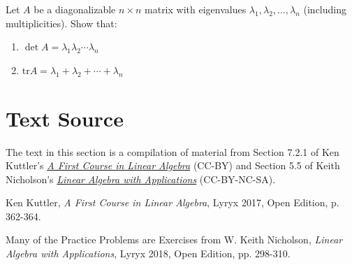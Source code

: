 \documentclass{ximera}
\begin{document}
\begin{problem}\label{prb:det_and_tr_diagonalizable}
Let $A$ be a diagonalizable $n \times n$ matrix with eigenvalues $\lambda_{1}, \lambda_{2}, \dots, \lambda_{n}$ (including multiplicities). Show that:

\begin{enumerate}
\item $\det A = \lambda_{1}\lambda_{2}\cdots \lambda_{n}$
\item $\mbox{tr} A = \lambda_{1} + \lambda_{2} + \cdots + \lambda_{n}$
\end{enumerate}
\end{problem}



\section*{Text Source}
The text in this section is a compilation of material from Section 7.2.1 of Ken Kuttler's \href{https://open.umn.edu/opentextbooks/textbooks/a-first-course-in-linear-algebra-2017}{\it A First Course in Linear Algebra} (CC-BY) and Section 5.5 of Keith Nicholson's \href{https://open.umn.edu/opentextbooks/textbooks/linear-algebra-with-applications}{\it Linear Algebra with Applications} (CC-BY-NC-SA).

Ken Kuttler, {\it  A First Course in Linear Algebra}, Lyryx 2017, Open Edition, p. 362-364.

Many of the Practice Problems are Exercises from 
W. Keith Nicholson, {\it Linear Algebra with Applications}, Lyryx 2018, Open Edition, pp. 298-310.
\end{document}
